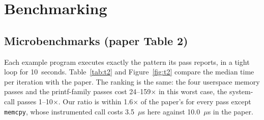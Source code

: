 \documentclass[11pt,a4paper]{article}
\newcommand{\pass}[1]{\texttt{#1}}
\begin{document}
\section{Benchmarking}
\label{sec:bench}

\subsection{Microbenchmarks (paper Table 2)}
\label{sec:micro}

Each example program executes exactly the pattern its pass reports, in a tight loop for 10~seconds.
Table~\ref{tab:t2} and Figure~\ref{fig:t2} compare the median time per iteration with the paper.
The ranking is the same: the four userspace memory passes and the printf-family passes cost
24--159$\times$ in this worst case, the system-call passes 1--10$\times$. Our ratio is within
1.6$\times$ of the paper's for every pass except \pass{memcpy}, whose instrumented call costs
3.5~$\mu$s here against 10.0~$\mu$s in the paper.
\end{document}

